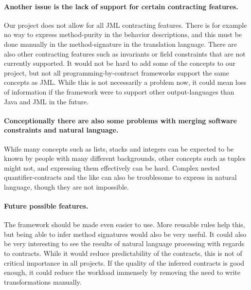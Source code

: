 \paragraph{Another issue is the lack of support for certain contracting features.}
Our project does not allow for all JML contracting features.
There is for example no way to express method-purity in the behavior descriptions, and this must be done manually in the method-signature in the translation language.
There are also other contracting features such as invariants or field constraints that are not currently supported.
It would not be hard to add some of the concepts to our project, but not all programming-by-contract frameworks support the same concepts as JML.
While this is not necessarily a problem now, it could mean loss of information if the framework were to support other output-languages than Java and JML in the future.

\paragraph{Conceptionally there are also some problems with merging software constraints and natural language.}
While many concepts such as lists, stacks and integers can be expected to be known by people with many different backgrounds, other concepts such as tuples might not, and expressing them effectively can be hard.
Complex nested quantifier-contracts and the like can also be troublesome to express in natural language, though they are not impossible.

\paragraph{Future possible features.}
The framework should be made even easier to use.
More reusable rules help this, but being able to infer method signatures would also be very useful.
It could also be very interesting to see the results of natural language processing with regards to contracts.
While it would reduce predictability of the contracts, this is not of critical importance in all projects.
If the quality of the inferred contracts is good enough, it could reduce the workload immensely by removing the need to write transformations manually.
